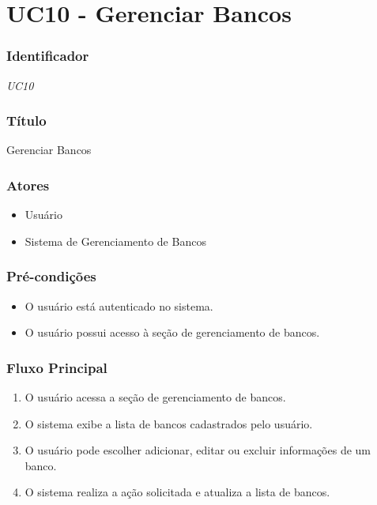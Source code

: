 \chapter{UC10 - Gerenciar Bancos}
\label{apendiceUC10}

\subsection*{Identificador}
\textit{UC10}

\subsection*{Título}
Gerenciar Bancos

\subsection*{Atores}
\begin{addmargin}[1.5cm]{0cm}
	\begin{itemize}
		\item Usuário
		\item Sistema de Gerenciamento de Bancos
	\end{itemize}
\end{addmargin}

\subsection*{Pré-condições}
\begin{addmargin}[1.5cm]{0cm}
	\begin{itemize}
		\item O usuário está autenticado no sistema.
		\item O usuário possui acesso à seção de gerenciamento de bancos.
	\end{itemize}
\end{addmargin}

\subsection*{Fluxo Principal}
\begin{addmargin}[1.5cm]{0cm}
	\begin{enumerate}
		\item O usuário acessa a seção de gerenciamento de bancos.
		\item O sistema exibe a lista de bancos cadastrados pelo usuário.
		\item O usuário pode escolher adicionar, editar ou excluir informações de um banco.
		\item O sistema realiza a ação solicitada e atualiza a lista de bancos.
	\end{enumerate}
\end{addmargin}

